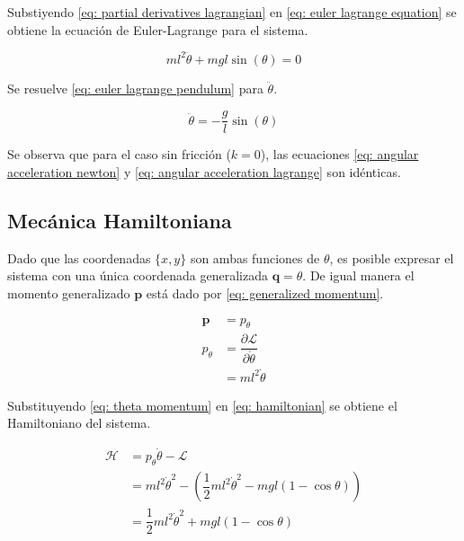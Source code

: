 Substiyendo \eqref{eq: partial derivatives lagrangian} 
en \eqref{eq: euler lagrange equation}
se obtiene la ecuación de Euler-Lagrange para el sistema.

\begin{equation}
 ml^2\ddot{\theta} + m g l \sin(\theta) = 0
 \label{eq: euler lagrange pendulum}
\end{equation}

Se resuelve \eqref{eq: euler lagrange pendulum} para $\ddot{\theta}$.

\begin{equation}
 \ddot{\theta} = - \dfrac{g}{l} \sin (\theta)
 \label{eq: angular acceleration lagrange}
\end{equation}


Se observa que para el caso sin fricción ($k = 0$), las ecuaciones 
\eqref{eq: angular acceleration newton} y 
\eqref{eq: angular acceleration lagrange}
son idénticas.


\subsection{Mecánica Hamiltoniana}

Dado que las coordenadas $\{x, y\}$ son ambas funciones de $\theta$,
es posible expresar el sistema con una única 
coordenada generalizada $\mathbf q = \theta$.
De igual manera el momento generalizado $\mathbf p$ está dado por \eqref{eq: generalized momentum}.

\begin{equation}
\begin{split}
 \mathbf p & = p_{\theta}\\
 p_{\theta} &= \dfrac{\partial \mathcal L}{\partial \dot \theta}\\
 &= m l^2 \dot \theta 
\end{split}
\label{eq: theta momentum}
\end{equation}

Substituyendo \eqref{eq: theta momentum} en 
\eqref{eq: hamiltonian} se obtiene el Hamiltoniano del sistema.

\begin{equation}
 \begin{split}
  \mathcal H & = p_{\theta} \dot \theta - \mathcal L \\
  & = m l^2 \dot \theta ^2 - (\dfrac{1}{2}m l^2 \dot{\theta}^2 - m g l (1 - \cos{\theta}))\\
  & = \dfrac{1}{2}m l^2 \dot{\theta}^2 + m g l (1 - \cos{\theta})
 \end{split}
 \label{eq: hamiltonian pendulum}
\end{equation}

